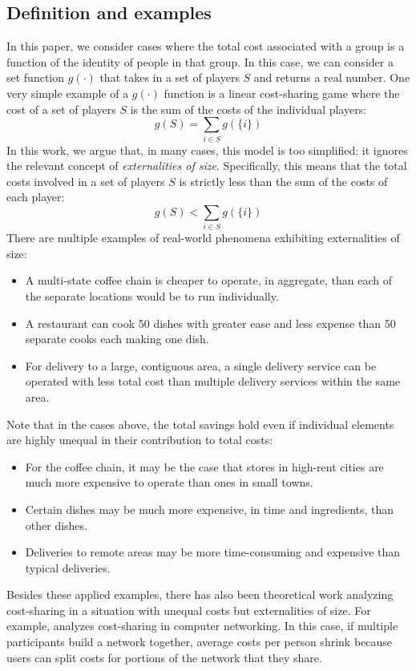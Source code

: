 \documentclass[sigconf]{acmart}
\newcommand{\cost}[0]{\ensuremath{g}}
\newcommand{\cd}[0]{\cdot}
\begin{document}
\subsection{Definition and examples}
In this paper, we consider cases where the total cost associated with a group is a function of the identity of people in that group. In this case, we can consider a set function $\cost(\cd)$ that takes in a set of players $S$ and returns a real number. One very simple example of a $\cost(\cd)$ function is a linear cost-sharing game where the cost of a set of players $S$ is the sum of the costs of the individual players:
$$\cost(S) = \sum_{i \in S}\cost(\{i\}) $$
In this work, we argue that, in many cases, this model is too simplified: it ignores the relevant concept of \emph{externalities of size}. Specifically, this means that the total costs involved in a set of players $S$ is strictly less than the sum of the costs of each player:
$$\cost(S) < \sum_{i \in S}\cost(\{i\}) $$
There are multiple examples of real-world phenomena exhibiting externalities of size:
\begin{itemize}
    \item A multi-state coffee chain is cheaper to operate, in aggregate, than each of the separate locations would be to run individually. 
    \item A restaurant can cook 50 dishes with greater ease and less expense than 50 separate cooks each making one dish. 
    \item For delivery to a large, contiguous area, a single delivery service can be operated with less total cost than multiple delivery services within the same area. 
\end{itemize}
Note that in the cases above, the total savings hold even if individual elements are highly unequal in their contribution to total costs:
\begin{itemize}
    \item For the coffee chain, it may be the case that stores in high-rent cities are much more expensive to operate than ones in small towns. 
    \item Certain dishes may be much more expensive, in time and ingredients, than other dishes. 
    \item Deliveries to remote areas may be more time-consuming and expensive than typical deliveries. 
\end{itemize}
Besides these applied examples, there has also been theoretical work analyzing cost-sharing in a situation with unequal costs but externalities of size. For example, \citet{herzog1997sharing} analyzes cost-sharing in computer networking. In this case, if multiple participants build a network together, average costs per person shrink because users can split costs for portions of the network that they share. 
\end{document}

